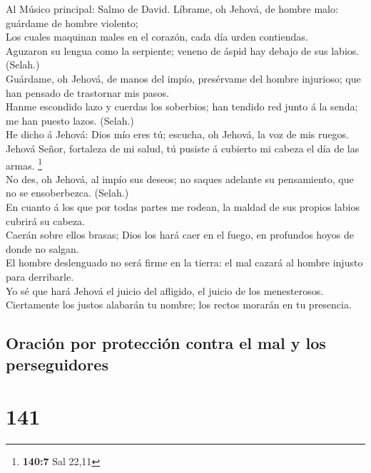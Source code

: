  Al Músico principal: Salmo de David. Líbrame, oh Jehová, de
hombre malo: guárdame de hombre violento;\\
 Los cuales maquinan males en el corazón, cada día urden
contiendas.\\
 Aguzaron su lengua como la serpiente; veneno de áspid hay
debajo de sus labios. (Selah.)\\
 Guárdame, oh Jehová, de manos del impío, presérvame del
hombre injurioso; que han pensado de trastornar mis pasos.\\
 Hanme escondido lazo y cuerdas los soberbios; han tendido
red junto á la senda; me han puesto lazos. (Selah.)\\
 He dicho á Jehová: Dios mío eres tú; escucha, oh Jehová, la
voz de mis ruegos.\\
 Jehová Señor, fortaleza de mi salud, tú pusiste á cubierto
mi cabeza el día de las armas. \footnote{\textbf{140:7} Sal 22,11}\\
 No des, oh Jehová, al impío sus deseos; no saques adelante
su pensamiento, que no se ensoberbezca. (Selah.)\\
 En cuanto á los que por todas partes me rodean, la maldad
de sus propios labios cubrirá su cabeza.\\
 Caerán sobre ellos brasas; Dios los hará caer en el fuego,
en profundos hoyos de donde no salgan.\\
 El hombre deslenguado no será firme en la tierra: el mal
cazará al hombre injusto para derribarle.\\
 Yo sé que hará Jehová el juicio del afligido, el juicio de
los menesterosos.\\
 Ciertamente los justos alabarán tu nombre; los rectos
morarán en tu presencia.

\hypertarget{oraciuxf3n-por-protecciuxf3n-contra-el-mal-y-los-perseguidores}{%
\subsection{Oración por protección contra el mal y los
perseguidores}\label{oraciuxf3n-por-protecciuxf3n-contra-el-mal-y-los-perseguidores}}

\hypertarget{section-140}{%
\section{141}\label{section-140}}

